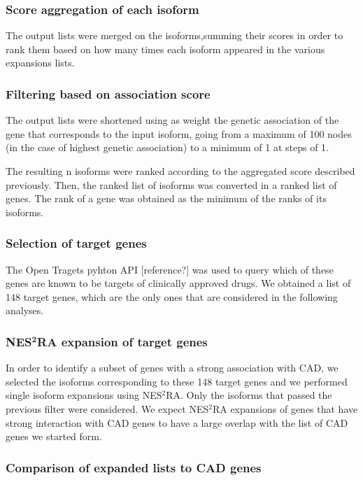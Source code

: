 \documentclass[fleqn,10pt]{SelfArx} %
\begin{document}
\subsubsection{Score aggregation of each isoform}
The output lists were merged on the isoforms,summing their scores in order to rank them based on how many times each isoform appeared in the various expansions lists.

\subsubsection{Filtering based on association score}
The output lists were shortened using as weight the genetic association of the gene that corresponds to the input isoform, going from a maximum of 100 nodes (in the case of highest genetic association) to a minimum of 1 at steps of 1. 

The resulting n isoforms were ranked according to the aggregated score described previously. Then, the ranked list of isoforms was converted in a ranked list of genes. The rank of a gene was obtained as the minimum of the ranks of its isoforms. 

\subsubsection{Selection of target genes}

The Open Tragets pyhton API [reference?] was used to query which of these genes are known to be targets of clinically approved drugs. We obtained a list of 148 target genes, which are the only ones that are considered in the following analyses.

\subsubsection{NES$^{\textbf{2}}$RA expansion of target genes}

In order to identify a subset of genes with a strong association with CAD, we selected the isoforms corresponding to these 148 target genes and we performed single isoform expansions using NES$^2$RA. Only the isoforms that passed the previous filter were considered. We expect NES$^2$RA expansions of genes that have strong interaction with CAD genes to have a large overlap with the list of CAD genes we started form.

\subsubsection{Comparison of expanded lists to CAD genes}
\end{document}
